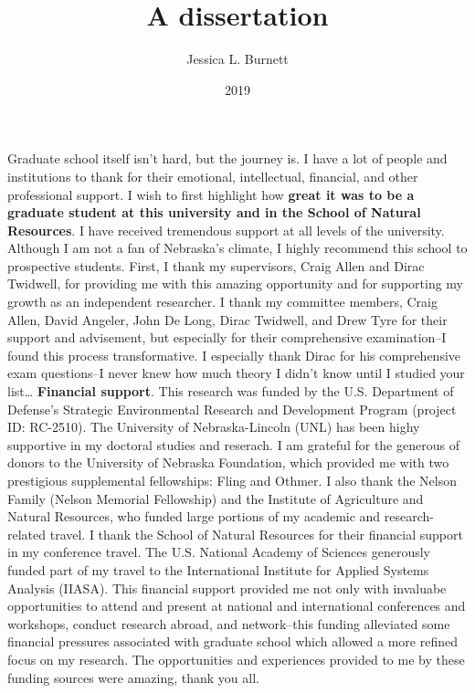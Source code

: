 \documentclass[12pt,twoside]{reedthesis}
\title{A dissertation}
\author{Jessica L. Burnett}
\date{2019}
\begin{document}
  \maketitle

\frontmatter %
\pagestyle{empty} %
  \begin{acknowledgements}
    Graduate school itself isn't hard, but the journey is. I have a lot of people and institutions to thank for their emotional, intellectual, financial, and other professional support. I wish to first highlight how \textbf{great it was to be a graduate student at this university and in the School of Natural Resources}. I have received tremendous support at all levels of the university. Although I am not a fan of Nebraska's climate, I highly recommend this school to prospective students.
    First, I thank my supervisors, Craig Allen and Dirac Twidwell, for providing me with this amazing opportunity and for supporting my growth as an independent researcher. I thank my committee members, Craig Allen, David Angeler, John De Long, Dirac Twidwell, and Drew Tyre for their support and advisement, but especially for their comprehensive examination--I found this process transformative. I especially thank Dirac for his comprehensive exam questions--I never knew how much theory I didn't know until I studied your list\ldots{}
    \textbf{Financial support}. This research was funded by the U.S. Department of Defense's Strategic Environmental Research and Development Program (project ID: RC-2510). The University of Nebraska-Lincoln (UNL) has been highy supportive in my doctoral studies and reserach. I am grateful for the generous of donors to the University of Nebraska Foundation, which provided me with two prestigious supplemental fellowships: Fling and Othmer. I also thank the Nelson Family (Nelson Memorial Fellowship) and the Institute of Agriculture and Natural Resources, who funded large portions of my academic and research-related travel. I thank the School of Natural Resources for their financial support in my conference travel. The U.S. National Academy of Sciences generously funded part of my travel to the International Institute for Applied Systems Analysis (IIASA). This financial support provided me not only with invaluabe opportunities to attend and present at national and international conferences and workshops, conduct research abroad, and network--this funding alleviated some financial pressures associated with graduate school which allowed a more refined focus on my research. The opportunities and experiences provided to me by these funding sources were amazing, thank you all.

\end{acknowledgements}
\end{document}
